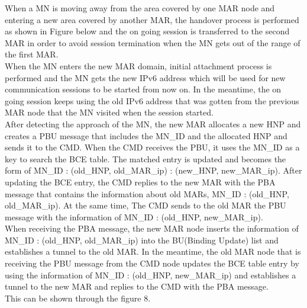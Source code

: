 \documentclass{article}
\begin{document}
When a MN is moving away from the area covered by one MAR node and
entering a new area covered by another MAR, the handover process is
performed as shown in Figure below and the on going session is
transferred to the second MAR in order to avoid session termination
when the MN gets out of the range of the first MAR.\\
\newline 
When the MN enters the new MAR domain, initial attachment process is
performed and the MN gets the new IPv6 address which will be used for
new communication sessions to be started from now on. In the meantime,
the on going session keeps using the old IPv6 address that was gotten
from the previous MAR node that the MN visited when the session
started.\\
\newline
After detecting the approach of the MN, the new MAR allocates a new
HNP and creates a PBU message that includes the MN\_ID and the
allocated HNP and sends it to the CMD. When the CMD receives the PBU,
it uses the MN\_ID as a key to search the BCE table. The matched entry
is updated and becomes the form of {MN\_ID : (old\_HNP, old\_MAR\_ip)
  : (new\_HNP, new\_MAR\_ip)}. After updating the BCE entry, the CMD
replies to the new MAR with the PBA message that contains the
information about old MARs, {MN\_ID : (old\_HNP, old\_MAR\_ip)}. At
the same time, The CMD sends to the old MAR the PBU message with the
information of {MN\_ID : (old\_HNP, new\_MAR\_ip)}.\\
\newline
When receiving the PBA message, the new MAR node inserts the
information of {MN\_ID : (old\_HNP, old\_MAR\_ip)} into the BU(Binding
Update) list and establishes a tunnel to the old MAR. In the meantime,
the old MAR node that is receiving the PBU message from the CMD node
updates the BCE table entry by using the information of {MN\_ID :
  (old\_HNP, new\_MAR\_ip)} and establishes a tunnel to the new MAR
and replies to the CMD with the PBA message. \\
This can be shown through the figure 8.
\end{document}
